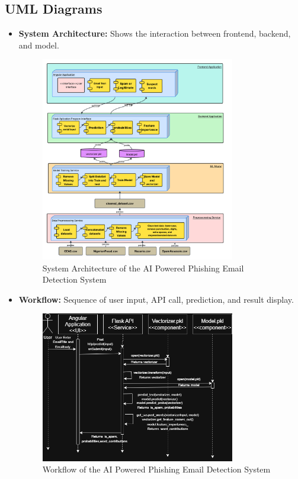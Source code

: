 \documentclass{article}
\begin{document}
\subsection{UML Diagrams} 
\begin{itemize}
    \item \textbf{System Architecture:} Shows the interaction between frontend, backend, and model.
    \begin{figure}[h!]
        \centering
        \includegraphics[width=0.8\textwidth]{Architecture.png}
        \caption{System Architecture of the AI Powered Phishing Email Detection System}
        \label{fig:system-architecture}
    \end{figure}

    \newpage
    \item \textbf{Workflow:} Sequence of user input, API call, prediction, and result display.
    \begin{figure}[h!]
        \centering
        \includegraphics[width=0.8\textwidth]{Sequence.png}
        \caption{Workflow of the AI Powered Phishing Email Detection System}
        \label{fig:workflow}
    \end{figure}
    
\end{itemize}
\newpage
\end{document}

